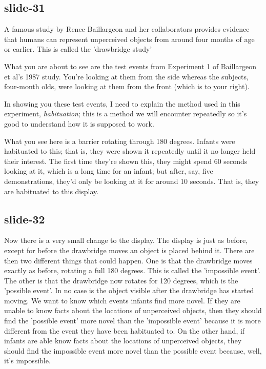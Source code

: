 \documentclass[12pt,\papersize]{extarticle}
\begin{document}
\subsection{slide-31}
A famous study by Renee Baillargeon and her collaborators provides evidence that humans can
represent unperceived objects from around four months of age or earlier.
This is called the 'drawbridge study'

What you are about to see are the test events from Experiment 1 of Baillargeon et al's
1987 study.  You're looking at them from the side whereas the subjects, four-month olds,
were looking at them from the front (which is to your right).

In showing you these test events,
I need to explain the method used in this experiment, \emph{habituation};
this is a method we will encounter repeatedly so it's good to understand how it is
supposed to work.


What you see here is a barrier rotating through 180 degrees.
Infants were habituated to this; that is, they were shown it repeatedly until it no longer
held their interest.
The first time they're shown this, they might spend 60 seconds looking at it, which is a long
time for an infant; but after, say, five demonstrations, they'd only be looking at it for
around 10 seconds.  That is, they are habituated to this display.

\subsection{slide-32}
Now there is a very small change to the display.
The display is just as before, except for before the drawbridge moves an object is placed
behind it.
There are then two different things that could happen.  One is that the drawbridge moves
exactly as before, rotating a full 180 degrees.  This is called the 'impossible event'.
The other is that the drawbridge now rotates for 120 degrees, which is the 'possible event'.
In no case is the object visible after the drawbridge has started moving.
We want to know which events infants find more novel.
If they are unable to know facts about  the locations of unperceived objects, then they should
find the
'possible event' more novel than the 'impossible event' because it is more different
from the event they have been habituated to.
On the other hand, if infants are able know facts about the locations of unperceived objects,
they should find the impossible event more novel than the possible event because, well,
it's impossible.
\end{document}
